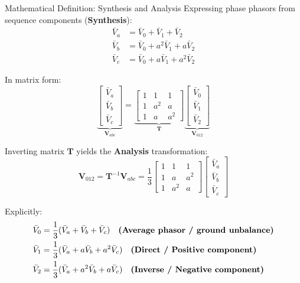 \begin{frame}[allowframebreaks]{Mathematical Definition: Synthesis and Analysis}
    Expressing phase phasors from sequence components (\textbf{Synthesis}):
    \begin{align}
        \bar{V}_a &= \bar{V}_0 + \bar{V}_1 + \bar{V}_2 \\
        \bar{V}_b &= \bar{V}_0 + a^2 \bar{V}_1 + a \bar{V}_2 \\
        \bar{V}_c &= \bar{V}_0 + a \bar{V}_1 + a^2 \bar{V}_2
    \end{align}

    In matrix form:
    \begin{equation}
        \underbrace{\begin{bmatrix} \bar{V}_a \\ \bar{V}_b \\ \bar{V}_c \end{bmatrix}}_{\mathbf{V}_{abc}}
        =
        \underbrace{\begin{bmatrix}
            1 & 1 & 1 \\
            1 & a^2 & a \\
            1 & a & a^2
        \end{bmatrix}}_{\mathbf{T}}
        \underbrace{\begin{bmatrix} \bar{V}_0 \\ \bar{V}_1 \\ \bar{V}_2 \end{bmatrix}}_{\mathbf{V}_{012}}
    \end{equation}

    Inverting matrix $\mathbf{T}$ yields the \textbf{Analysis} transformation:
    \begin{equation}
        \mathbf{V}_{012} = \mathbf{T}^{-1} \mathbf{V}_{abc}
        =
        \frac{1}{3}
        \begin{bmatrix}
            1 & 1 & 1 \\
            1 & a & a^2 \\
            1 & a^2 & a
        \end{bmatrix}
        \begin{bmatrix} \bar{V}_a \\ \bar{V}_b \\ \bar{V}_c \end{bmatrix}
    \end{equation}

    Explicitly:
    \begin{align}
        \bar{V}_0 &= \frac{1}{3}(\bar{V}_a + \bar{V}_b + \bar{V}_c) \quad \text{\bf (Average phasor / ground unbalance)} \\
        \bar{V}_1 &= \frac{1}{3}(\bar{V}_a + a \bar{V}_b + a^2 \bar{V}_c) \quad \text{\bf (Direct / Positive component)} \\
        \bar{V}_2 &= \frac{1}{3}(\bar{V}_a + a^2 \bar{V}_b + a \bar{V}_c) \quad \text{\bf (Inverse / Negative component)}
    \end{align}
\end{frame}

